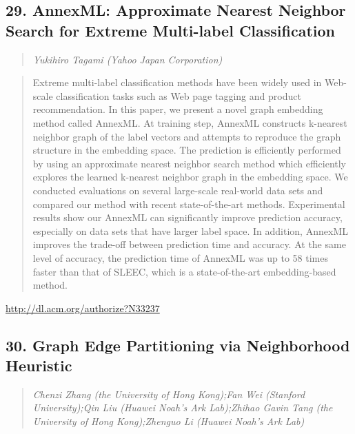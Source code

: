 \documentclass{article}
\begin{document}
\subsection{29. AnnexML: Approximate Nearest Neighbor Search for Extreme Multi-label Classification}

\begin{quote}
\footnotesize{\textit{Yukihiro Tagami (Yahoo Japan Corporation)}}

\end{quote}

\begin{quote}
Extreme multi-label classification methods have been widely used in Web-scale classification tasks such as Web page tagging and product recommendation. In this paper, we present a novel graph embedding method called AnnexML. At training step, AnnexML constructs k-nearest neighbor graph of the label vectors and attempts to reproduce the graph structure in the embedding space. The prediction is efficiently performed by using an approximate nearest neighbor search method which efficiently explores the learned k-nearest neighbor graph in the embedding space. We conducted evaluations on several large-scale real-world data sets and compared our method with recent state-of-the-art methods. Experimental results show our AnnexML can significantly improve prediction accuracy, especially on data sets that have larger label space. In addition, AnnexML improves the trade-off between prediction time and accuracy. At the same level of accuracy, the prediction time of AnnexML was up to 58 times faster than that of SLEEC, which is a state-of-the-art embedding-based method.
\end{quote}

\href{http://dl.acm.org/authorize?N33237}{http://dl.acm.org/authorize?N33237}

\subsection{30. Graph Edge Partitioning via Neighborhood Heuristic}

\begin{quote}
\footnotesize{\textit{Chenzi Zhang (the University of Hong Kong);Fan Wei (Stanford University);Qin Liu (Huawei Noah’s Ark Lab);Zhihao Gavin Tang (the University of Hong Kong);Zhenguo Li (Huawei Noah’s Ark Lab)}}

\end{quote}
\end{document}

